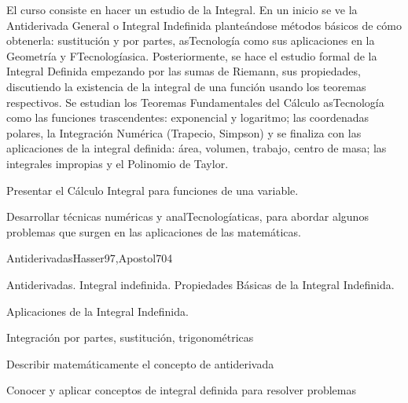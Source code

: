 \begin{syllabus}


\begin{justification}
El curso consiste en hacer un estudio de la Integral. En un inicio se ve la Antiderivada General o Integral Indefinida planteándose métodos básicos de cómo obtenerla: sustitución y por partes, asTecnología como sus aplicaciones en la Geometría y FTecnologíasica. Posteriormente, se hace el estudio formal de la Integral Definida empezando por las sumas de Riemann, sus propiedades, discutiendo la existencia de la integral de una función usando los teoremas respectivos. Se estudian los Teoremas Fundamentales del Cálculo asTecnología como las funciones trascendentes: exponencial y logaritmo; las coordenadas polares, la Integración Numérica (Trapecio, Simpson) y se finaliza con las aplicaciones de la integral definida: área, volumen, trabajo, centro de masa; las integrales impropias y el Polinomio de Taylor.
\end{justification}

\begin{goals}
\item Presentar el Cálculo Integral para funciones de una variable.
\item Desarrollar técnicas numéricas y analTecnologíaticas, para abordar algunos problemas que surgen en las aplicaciones de las matemáticas.
\end{goals}

\begin{outcomes}
\end{outcomes}

\begin{unit}{Antiderivadas}{Hasser97,Apostol70}{4}
\begin{topics}
      \item Antiderivadas. Integral indefinida. Propiedades Básicas de la  Integral Indefinida.
      \item Aplicaciones de la Integral Indefinida.
      \item Integración por partes,  sustitución, trigonométricas
   \end{topics}

   \begin{unitgoals}
      \item Describir matemáticamente el concepto de antiderivada
      \item Conocer y aplicar conceptos de integral definida para resolver problemas
   \end{unitgoals}
\end{unit}


\end{syllabus}
